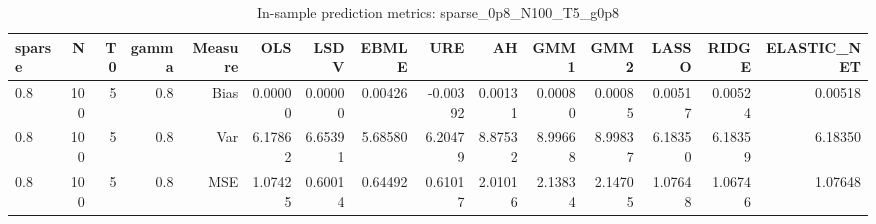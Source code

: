 \begin{table}[!htbp]\centering
\caption{In-sample prediction metrics: sparse_0p8_N100_T5_g0p8}
\label{tab:table2_sparse_0p8_N100_T5_g0p8}
\begin{tabular}{lrrrrrrrrrrrrrr}
\hline
sparse & N & T0 & gamma & Measure & OLS & LSDV & EBMLE & URE & AH & GMM1 & GMM2 & LASSO & RIDGE & ELASTIC_NET \\
\hline
0.8 & 100 & 5 & 0.8 & Bias & 0.00000 & 0.00000 & 0.00426 & -0.00392 & 0.00131 & 0.00080 & 0.00085 & 0.00517 & 0.00524 & 0.00518 \\
0.8 & 100 & 5 & 0.8 & Var & 6.17862 & 6.65391 & 5.68580 & 6.20479 & 8.87532 & 8.99668 & 8.99837 & 6.18350 & 6.18359 & 6.18350 \\
0.8 & 100 & 5 & 0.8 & MSE & 1.07425 & 0.60014 & 0.64492 & 0.61017 & 2.01016 & 2.13834 & 2.14705 & 1.07648 & 1.06746 & 1.07648 \\
\hline
\end{tabular}
\end{table}

